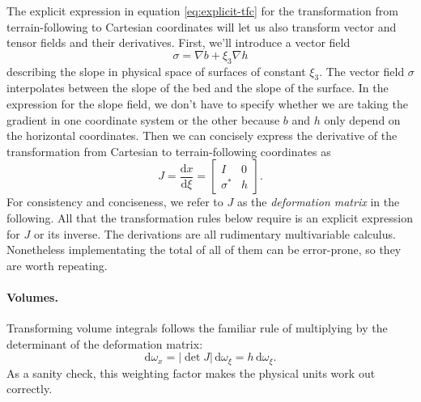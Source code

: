 \documentclass[gmd, manuscript]{copernicus}
\begin{document}
The explicit expression in equation \eqref{eq:explicit-tfc} for the transformation from terrain-following to Cartesian coordinates will let us also transform vector and tensor fields and their derivatives.
First, we'll introduce a vector field
\begin{equation}
    \sigma = \nabla b + \xi_3\nabla h
    \label{eq:slope-field}
\end{equation}
describing the slope in physical space of surfaces of constant $\xi_3$.
The vector field $\sigma$ interpolates between the slope of the bed and the slope of the surface.
In the expression for the slope field, we don't have to specify whether we are taking the gradient in one coordinate system or the other because $b$ and $h$ only depend on the horizontal coordinates.
Then we can concisely express the derivative of the transformation from Cartesian to terrain-following coordinates as
\begin{equation}
    J = \frac{\mathrm dx}{\mathrm d\xi} = \left[\begin{matrix}I & 0 \\ \sigma^* & h\end{matrix}\right].
    \label{eq:dx-dxi}
\end{equation}
For consistency and conciseness, we refer to $J$ as the \emph{deformation matrix} in the following.
All that the transformation rules below require is an explicit expression for $J$ or its inverse.
The derivations are all rudimentary multivariable calculus.
Nonetheless implementating the total of all of them can be error-prone, so they are worth repeating.

\paragraph{Volumes.}
Transforming volume integrals follows the familiar rule of multiplying by the determinant of the deformation matrix:
\begin{equation}
    \mathrm d\omega_x = |\det J|\,\mathrm{d}\omega_\xi = h\,\mathrm{d}\omega_\xi.
    \label{eq:xform-volume}
\end{equation}
As a sanity check, this weighting factor makes the physical units work out correctly.
\end{document}
